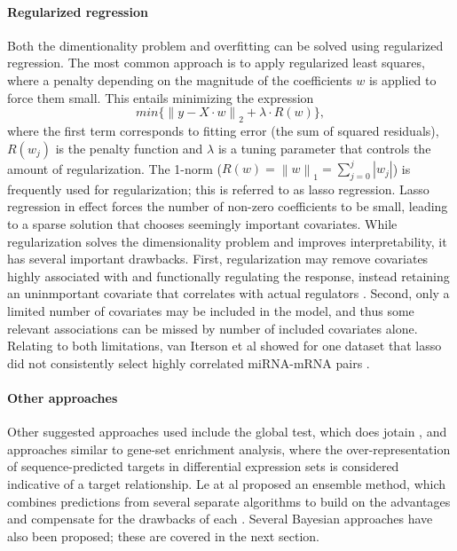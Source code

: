 \paragraph{Regularized regression}
Both the dimentionality problem and overfitting can be solved using regularized
regression. The most common approach is to apply regularized least squares,
where a penalty depending on the magnitude of the coefficients $w$
is applied to force them small. This entails minimizing the expression
\begin{equation}
	min\{ \left \| y - X \cdot w \right \|_2 + \lambda \cdot R(w) \} ,
\end{equation}
where the first term corresponds to fitting error (the sum of squared residuals),
$R(w_j)$ is the penalty function and $\lambda$ is a tuning
parameter that controls the amount of regularization. 
The 1-norm ($R(w) = \left \| w \right \|_1 = \sum_{j=0}^{j} |w_j|$)
is frequently used for regularization; this is referred to as lasso regression.
Lasso regression in effect forces the number of non-zero coefficients to be small,
leading to a sparse solution that chooses seemingly important covariates.
While regularization solves the dimensionality problem and improves
interpretability, it has several important drawbacks. First, regularization
may remove covariates highly associated with and functionally regulating the
response, instead retaining an uninmportant covariate that correlates with
actual regulators \citep{Engelmann2012}. Second, only a limited number of
covariates may be included in the model, and thus some relevant associations
can be missed by number of included covariates alone.%
Relating to both limitations, van Iterson et al showed for one dataset that
lasso did not consistently select highly correlated miRNA-mRNA pairs
\citep{vanIterson2013}.

\paragraph{Other approaches}
Other suggested approaches used include the global test, which does jotain
\citep{vanIterson2013}, and approaches similar to gene-set enrichment
analysis, where the over-representation of sequence-predicted targets in
differential expression sets is considered indicative of a target
relationship. Le at al proposed an ensemble method, which
combines predictions from several separate algorithms to
build on the advantages and compensate for the drawbacks of each
\citep{Le2015}.
Several Bayesian approaches have also been proposed;
these are covered in the next section.


